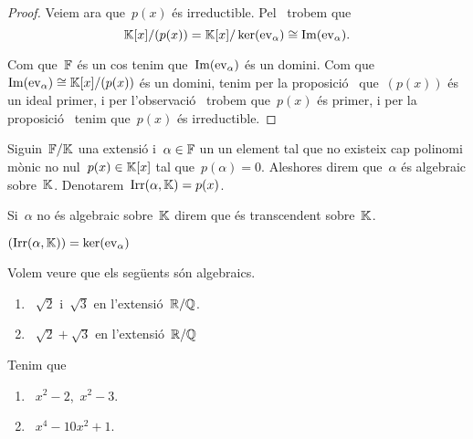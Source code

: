 \documentclass[../../main.tex]{subfiles}
\begin{document}
\begin{lemma}
\begin{proof}
            Veiem ara que~\(p(x)\) és irreductible.
            Pel~ trobem que
            \[
                \mathbb{K}[x]/(p(x))=\mathbb{K}[x]/\operatorname{ker}(\mathrm{ev}_{\alpha})\cong\operatorname{Im}(\mathrm{ev}_{\alpha}).
            \]

            Com que~\(\mathbb{F}\) és un cos tenim que~\(\operatorname{Im}(\mathrm{ev}_{\alpha})\) és un domini.
            Com que~\(\operatorname{Im}(\mathrm{ev}_{\alpha})\cong\mathbb{K}[x]/(p(x))\) és un domini, tenim per la proposició~ que~\((p(x))\) és un ideal primer, i per l'observació~ trobem que~\(p(x)\) és primer, i per la proposició~ tenim que~\(p(x)\) és irreductible.
        \end{proof}
    \end{lemma}
    \begin{definition}
        \label{def:element algebraic}
        \label{def:element transcendent}
        Siguin~\(\mathbb{F}/\mathbb{K}\) una extensió i~\(\alpha\in\mathbb{F}\) un un element tal que no existeix cap polinomi mònic no nul~\(p(x)\in\mathbb{K}[x]\) tal que~\(p(\alpha)=0\).
        Aleshores direm que~\(\alpha\) és {algebraic} sobre~\(\mathbb{K}\).
        Denotarem~\(\operatorname{Irr}(\alpha,\mathbb{K})=p(x)\).

        Si~\(\alpha\) no és algebraic sobre~\(\mathbb{K}\) direm que és {transcendent} sobre~\(\mathbb{K}\).
    \end{definition}
    \begin{observation}
        \label{obs:polinomi mínim de descomposició}
        \((\operatorname{Irr}(\alpha,\mathbb{K}))=\operatorname{ker}(\mathrm{ev}_{\alpha})\)
    \end{observation}
    \begin{example}
        \label{ex:elements algebraics}
        Volem veure que els següents són algebraics.
        \begin{enumerate}
            \item~\(\sqrt{2}\) i~\(\sqrt{3}\) en l'extensió~\(\mathbb{R}/\mathbb{Q}\).
            \item~\(\sqrt{2}+\sqrt{3}\) en l'extensió~\(\mathbb{R}/\mathbb{Q}\)
        \end{enumerate}
        \begin{solution}
            Tenim que %
            \begin{enumerate}
            \item~\(x^{2}-2\),~\(x^{2}-3\).
            \item~\(x^{4}-10x^{2}+1\).\qedhere
            \end{enumerate}
        \end{solution}
    \end{example}
\end{document}
